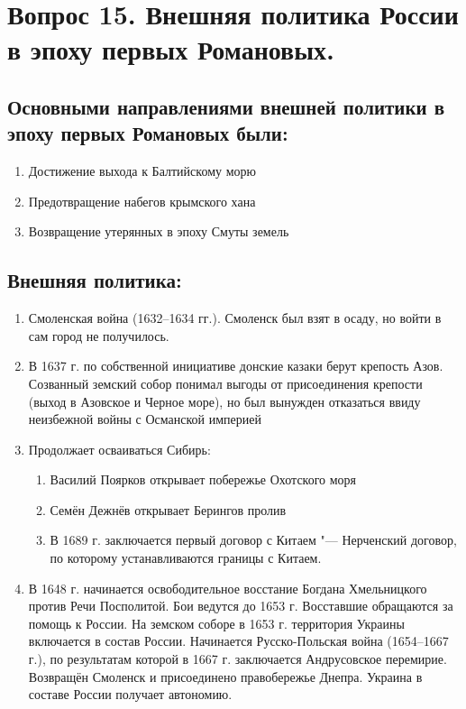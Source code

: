 \section{Вопрос 15. Внешняя политика России в эпоху первых Романовых.}

\subsection{Основными направлениями внешней политики в эпоху первых Романовых были:}

\begin{enumerate}
    \item{ Достижение выхода к Балтийскому морю }
    \item{ Предотвращение набегов крымского хана }
    \item{ Возвращение утерянных в эпоху Смуты земель }
\end{enumerate}

\subsection{Внешняя политика:}

\begin{enumerate}
    \item{ Смоленская война (1632--1634 гг.). Смоленск был взят в осаду, но войти в сам город не получилось. }
    \item{ В 1637 г. по собственной инициативе донские  казаки берут крепость Азов. Созванный земский собор понимал выгоды от присоединения крепости (выход в Азовское и Черное море), но был вынужден отказаться ввиду неизбежной войны с Османской империей }
    \item{ Продолжает осваиваться Сибирь:

        \begin{enumerate}
            \item{ Василий Поярков открывает побережье Охотского моря }
            \item{ Семён Дежнёв открывает Берингов пролив }
            \item{ В 1689 г. заключается первый договор с Китаем "--- Нерченский договор, по которому устанавливаются границы с Китаем.  }
        \end{enumerate}
    }
    \item{ В 1648 г. начинается освободительное восстание Богдана Хмельницкого против Речи Посполитой. Бои ведутся до 1653 г. Восставшие обращаются за помощь к России. На земском соборе в 1653 г. территория Украины включается в состав России. Начинается Русско-Польская война (1654--1667 г.), по результатам которой в 1667 г. заключается Андрусовское перемирие. Возвращён Смоленск и присоединено правобережье Днепра. Украина в составе России получает автономию. }
\end{enumerate}
